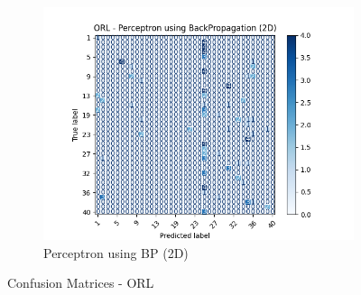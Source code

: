 \begin{figure}[htbp]
        \begin{subfigure}[b]{0.33\linewidth}
                \centering
                \includegraphics[width=1\linewidth]{../source/orl/pictures/perceptronBP-confusion-2d.png}
                \caption{Perceptron using BP (2D)}
                \label{fig:orl-confusion-pbp-2}
        \end{subfigure}
        \caption{Confusion Matrices - ORL}
        \label{fig:orl-confusion}
\end{figure}

